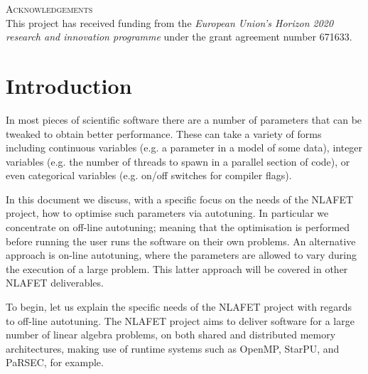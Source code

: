 \documentclass[a4paper,12pt]{article}
\begin{document}
\noindent
\textsc{Acknowledgements}\\[1em]
This project has received funding from the \emph{European Union's Horizon 2020 research and innovation programme} under the grant agreement number 671633.





%

\newpage

\renewcommand{\contentsname}{Table of Contents}
\tableofcontents

\listoffigures



\newpage

%

\section{Introduction}
\label{sec.introduction}
In most pieces of scientific software there are a number of parameters
that can be tweaked to obtain better performance.  These can take a
variety of forms including continuous variables (e.g. a parameter in a
model of some data), integer variables (e.g. the number of threads to
spawn in a parallel section of code), or even categorical variables
(e.g. on/off switches for compiler flags).

In this document we discuss, with a specific focus on the needs of the
NLAFET project, how to optimise such parameters via autotuning.  In
particular we concentrate on off-line autotuning; meaning that the
optimisation is performed before running the user runs the software on
their own problems.  An alternative approach is on-line autotuning,
where the parameters are allowed to vary during the execution of a
large problem.  This latter approach will be covered in other NLAFET
deliverables.

To begin, let us explain the specific needs of the NLAFET project with
regards to off-line autotuning.  The NLAFET project aims to deliver
software for a large number of linear algebra problems, on both shared
and distributed memory architectures, making use of runtime systems
such as OpenMP, StarPU, and PaRSEC, for example.
\end{document}
